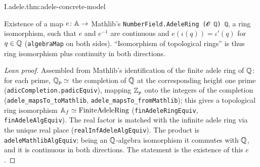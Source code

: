 \begin{theorem}
\end{theorem}
\begin{tfformal}{I.adele.thm:adele-concrete-model}
\begin{tffidelity}
Existence of a map $e\colon\mathbb{A}\to$ Mathlib's \texttt{NumberField.AdeleRing (𝓞 ℚ) ℚ}, a ring isomorphism, such that $e$ and $e^{-1}$ are continuous and $e(\iota(q))=\iota'(q)$ for $q\in\mathbb{Q}$ (\texttt{algebraMap} on both sides). ``Isomorphism of topological rings'' is thus ring isomorphism plus continuity in both directions.
\end{tffidelity}
\end{tfformal}
\begin{proof}[Lean proof]
Assembled from Mathlib's identification of the finite adele ring of $\mathbb{Q}$: for each prime, $\mathbb{Q}_p\simeq$ the completion of $\mathbb{Q}$ at the corresponding height one prime (\texttt{adicCompletion.padicEquiv}), mapping $\mathbb{Z}_p$ onto the integers of the completion (\texttt{adele\_mapsTo\_toMathlib}, \texttt{adele\_mapsTo\_fromMathlib}); this gives a topological ring isomorphism $\mathbb{A}_f\simeq\mathrm{FiniteAdeleRing}$ (\texttt{finAdeleRingEquiv}, \texttt{finAdeleAlgEquiv}). The real factor is matched with the infinite adele ring via the unique real place (\texttt{realInfAdeleAlgEquiv}). The product is \texttt{adeleMathlibAlgEquiv}; being an $\mathbb{Q}$-algebra isomorphism it commutes with $\mathbb{Q}$, and it is continuous in both directions. The statement is the existence of this $e$.
\end{proof}

